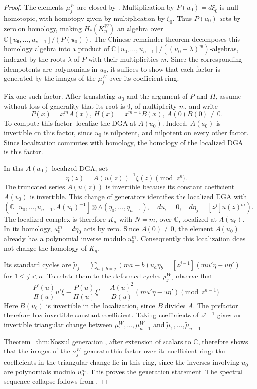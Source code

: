\documentclass[reqno]{amsart}
\theoremstyle{definition}
\theoremstyle{remark}
\begin{document}
\begin{proof}
The elements $\mu_j^W$ are closed by \cite[Lemma~7.8]{ballinger2025stable}. Multiplication by $P(u_0)=d\xi_0$ is null-homotopic, with homotopy given by multiplication by $\xi_0$. Thus $P(u_0)$ acts by zero on homology, making $H_*(K_n^W)$ an algebra over $\mathbb C[u_0,\dots,u_{n-1}]/(P(u_0))$. The Chinese remainder theorem decomposes this homology algebra into a product of $\mathbb C[u_0,\dots,u_{n-1}]/((u_0-\lambda)^m)$-algebras, indexed by the roots $\lambda$ of $P$ with their multiplicities $m$. Since the corresponding idempotents are polynomials in $u_0$, it suffices to show that each factor is generated by the images of the $\mu_j^W$ over its coefficient ring.

Fix one such factor. After translating $u_0$ and the argument of $P$ and $H$, assume without loss of generality that its root is $0$, of multiplicity $m$, and write \[P(x)=x^mA(x),\ H(x)=x^{m-1}B(x),\ A(0)B(0)\ne0.\] To compute this factor, localize the DGA at $A(u_0)$. Indeed, $A(u_0)$ is invertible on this factor, since $u_0$ is nilpotent, and nilpotent on every other factor. Since localization commutes with homology, the homology of the localized DGA is this factor.

In this $A(u_0)$-localized DGA, set
\[\eta(z)=A(u(z))^{-1}\xi(z)\pmod{z^n}.\]
The truncated series $A(u(z))$ is invertible because its constant coefficient $A(u_0)$ is invertible. This change of generators identifies the localized DGA with
\[\left(\mathbb C[u_0,\dots,u_{n-1},A(u_0)^{-1}]\otimes\wedge(\eta_0,\dots,\eta_{n-1}),\quad du_i=0,\quad d\eta_j=[z^j]u(z)^m\right).\]
The localized complex is therefore $K_n$ with $N=m$, over $\mathbb C$, localized at $A(u_0)$. In its homology, $u_0^m=d\eta_0$ acts by zero. Since $A(0)\ne0$, the element $A(u_0)$ already has a polynomial inverse modulo $u_0^m$. Consequently this localization does not change the homology of $K_n$.

Its standard cycles are $\widetilde\mu_j=\sum_{a+b=j}(ma-b)u_a\eta_b=[z^{j-1}](mu'\eta-u\eta')$ for $1\le j<n$. To relate them to the deformed cycles $\mu_j^W$, observe that
\[\frac{P'(u)}{H(u)}u'\xi-\frac{P(u)}{H(u)}\xi'=\frac{A(u)^2}{B(u)}(mu'\eta-u\eta')\pmod{z^{n-1}}.\]
Here $B(u_0)$ is invertible in the localization, since $B$ divides $A$. The prefactor therefore has invertible constant coefficient. Taking coefficients of $z^{j-1}$ gives an invertible triangular change between $\mu_1^W,\dots,\mu_{n-1}^W$ and $\widetilde\mu_1,\dots,\widetilde\mu_{n-1}$.

Theorem~\ref{thm:Koszul generation}, after extension of scalars to $\mathbb C$, therefore shows that the images of the $\mu_j^W$ generate this factor over its coefficient ring: the coefficients in the triangular change lie in this ring, since the inverses involving $u_0$ are polynomials modulo $u_0^m$. This proves the generation statement. The spectral sequence collapse follows from \cite[Theorem~7.10]{ballinger2025stable}.
\end{proof}
\end{document}
